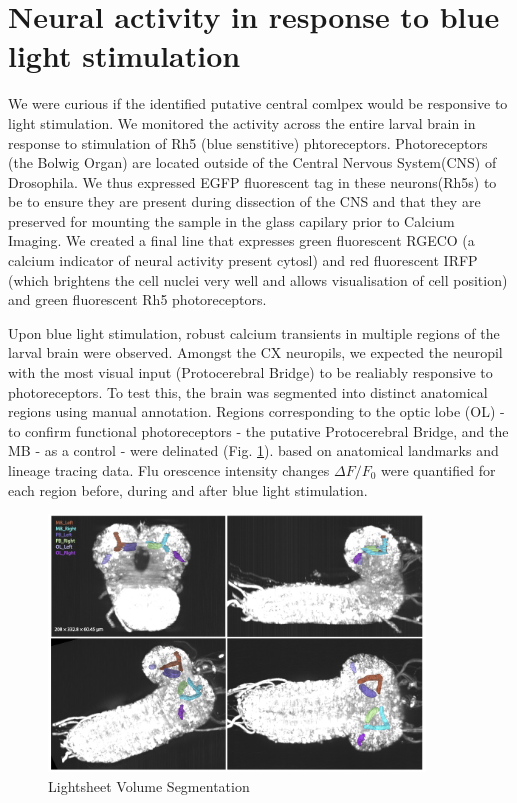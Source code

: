 \section{Neural activity in response to blue light stimulation}
We were curious if the identified putative central comlpex would be responsive to light stimulation. 
We monitored the activity across the entire larval brain in response to stimulation of Rh5 (blue senstitive) phtoreceptors. Photoreceptors (the Bolwig Organ) are located outside of the Central Nervous System(CNS) of Drosophila. We thus expressed  EGFP fluorescent tag in these neurons(Rh5s) to be to ensure they are present during dissection of the CNS and that they are preserved for mounting the sample in the glass capilary prior to Calcium Imaging. We created a final line that expresses green fluorescent RGECO (a calcium indicator of neural activity present cytosl) and red fluorescent IRFP (which brightens the cell nuclei very well and allows visualisation of cell position) and green fluorescent Rh5 photoreceptors. 


Upon blue light stimulation, robust calcium transients in multiple regions of the larval brain were observed. Amongst the CX neuropils, we expected the neuropil with the most visual input (Protocerebral Bridge) to be realiably responsive to photoreceptors. To test this, the brain was segmented into distinct anatomical regions using manual annotation. Regions corresponding to the optic lobe (OL) - to confirm functional photoreceptors - the putative Protocerebral Bridge, and the MB - as a control -  were delinated (Fig. \ref{LSSegmentation}).
based on anatomical landmarks and lineage tracing data. Flu orescence intensity changes $\Delta F/F_0$ were quantified for each region before, during and after blue light stimulation. 

   \begin{figure}
        \centering
        \includegraphics[width=10cm]{Figs/CX/LSSegmentation.pdf}
        \caption[Lightsheet volume Segmentation]{Lightsheet Volume Segmentation}
        \label{LSSegmentation}
    \end{figure}

